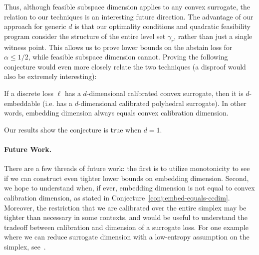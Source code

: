\documentclass[anon]{colt2020} %
\newcommand{\Comments}{1}
\newcommand{\mynote}[2]{\ifnum\Comments=1\textcolor{#1}{#2}\fi}
\newcommand{\jessie}[1]{\mynote{purple}{[JF: #1]}}
\newcommand{\abstain}[1]{\mathrm{abstain}_{#1}}
\begin{document}
Thus, although feasible subspace dimension applies to any convex surrogate, the relation to our techniques is an interesting future direction.
The advantage of our approach for generic $d$ is that our optimality conditions and quadratic feasibility program consider the structure of the entire level set $\gamma_r$, rather than just a single witness point.
This allows us to prove lower bounds on the abstain loss for $\alpha \leq 1/2$, while feasible subspace dimension cannot.
Proving the following conjecture would even more closely relate the two techniques (a disproof would also be extremely interesting):
\begin{conjecture}\label{conj:embed-equals-ccdim}
  If a discrete loss $\ell$ has a $d$-dimensional calibrated convex surrogate, then it is $d$-embeddable (i.e. has a $d$-dimensional calibrated polyhedral surrogate).
  In other words, embedding dimension always equals convex calibration dimension.%
\end{conjecture}
Our results show the conjecture is true when $d=1$.

\paragraph{Future Work.}
There are a few threads of future work: the first is to utilize monotonicity to see if we can construct even tighter lower bounds on embedding dimension.
Second, we hope to understand when, if ever, embedding dimension is not equal to convex calibration dimension, as stated in Conjecture~\ref{conj:embed-equals-ccdim}.
Moreover, the restriction that we are calibrated over the entire simplex may be tighter than necessary in some contexts, and would be useful to understand the tradeoff between calibration and dimension of a surrogate loss.
For one example where we can reduce surrogate dimension with a low-entropy assumption on the simplex, see~\citet[Example 6]{agarwal2015consistent}.

%
\newpage
\end{document}
